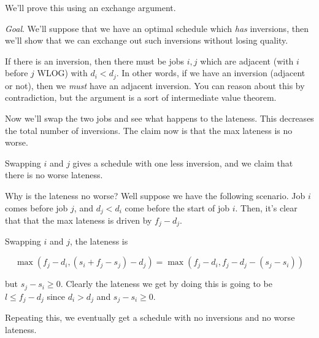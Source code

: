 \documentclass[12pt]{article}
\begin{document}
  {
    We'll prove this using an exchange argument.

    {\it Goal}. We'll suppose that we have an optimal schedule which {\it has}
    inversions, then we'll show that we can exchange out such inversions without
    losing quality.

    If there is an inversion, then there must be jobs $i, j$ which are adjacent
    (with $i$ before $j$ WLOG) with $d_i < d_j$. In other words, if we have an
    inversion (adjacent or not), then we {\it must} have an adjacent inversion.
    You can reason about this by contradiction, but the argument is a sort of
    intermediate value theorem.

    Now we'll swap the two jobs and see what happens to the lateness. This
    decreases the total number of inversions. The claim now is that the max
    lateness is no worse.

    Swapping $i$ and $j$ gives a schedule with one less inversion, and we claim
    that there is no worse lateness.

    Why is the lateness no worse? Well suppose we have the following scenario.
    Job $i$ comes before job $j$, and $d_j < d_i$ come before the start of job
    $i$. Then, it's clear that that the max lateness is driven by $f_j - d_j$.

    Swapping $i$ and $j$, the lateness is

    \[
      \max(f_j - d_i, (s_i + f_j - s_j) - d_j) = \max(f_j - d_i, f_j - d_j - (s_j - s_i))
    \]

    but $s_j - s_i \ge 0$. Clearly the lateness we get by doing this is going to
    be $l \le f_j - d_j$ since $d_i > d_j$ and $s_j - s_i \ge 0$.

    Repeating this, we eventually get a schedule with no inversions and no worse
    lateness.
  }





  \newpage

\end{document}
